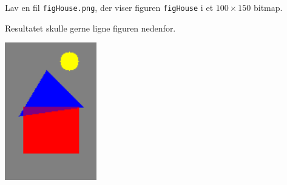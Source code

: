Lav en fil \texttt{figHouse.png}, der viser figuren
  \texttt{figHouse} i et $100\times150$ bitmap.

  Resultatet skulle gerne ligne figuren nedenfor.

\begin{center}
  \includegraphics[width=0.3\textwidth]{figHouse.png}
\end{center}
